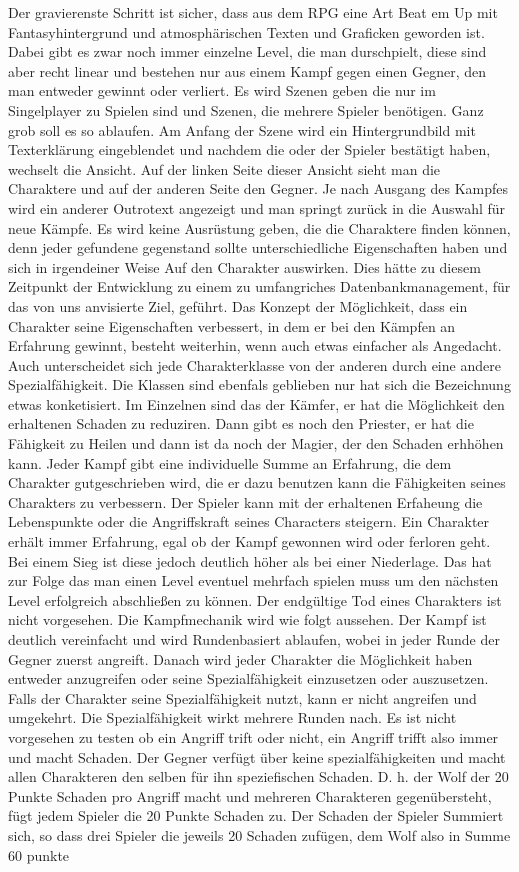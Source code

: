 Der gravierenste Schritt ist sicher, dass aus dem RPG eine Art Beat em Up mit Fantasyhintergrund und atmosphärischen Texten und Graficken geworden ist. Dabei gibt es zwar noch immer einzelne Level, die man durschpielt, diese sind aber recht linear und bestehen nur aus einem Kampf gegen einen Gegner, den man entweder gewinnt oder verliert. Es wird Szenen geben die nur im Singelplayer zu Spielen sind und Szenen, die mehrere Spieler benötigen. Ganz grob soll es so ablaufen. Am Anfang der Szene wird ein Hintergrundbild mit Texterklärung eingeblendet und nachdem die oder der Spieler bestätigt haben, wechselt die Ansicht. Auf der linken Seite dieser Ansicht sieht man die Charaktere und auf der anderen Seite den Gegner. Je nach Ausgang des Kampfes wird ein anderer Outrotext angezeigt und man springt zurück in die Auswahl für neue Kämpfe. Es wird keine Ausrüstung geben, die die Charaktere finden können, denn jeder gefundene gegenstand sollte unterschiedliche Eigenschaften haben und sich in irgendeiner Weise Auf den Charakter auswirken. Dies hätte zu diesem Zeitpunkt der Entwicklung zu einem zu umfangriches Datenbankmanagement, für das von uns anvisierte Ziel, geführt. Das Konzept der Möglichkeit, dass ein Charakter seine Eigenschaften verbessert, in dem er bei den Kämpfen an Erfahrung gewinnt, besteht weiterhin, wenn auch etwas einfacher als Angedacht. Auch unterscheidet sich jede Charakterklasse von der anderen durch eine andere Spezialfähigkeit. Die Klassen sind ebenfals geblieben nur hat sich die Bezeichnung etwas konketisiert. Im Einzelnen sind das der Kämfer, er hat die Möglichkeit den erhaltenen Schaden zu reduziren. Dann gibt es noch den Priester, er hat die Fähigkeit zu Heilen und dann ist da noch der Magier, der den Schaden erhhöhen kann. Jeder Kampf gibt eine individuelle Summe an Erfahrung, die dem Charakter gutgeschrieben wird, die er dazu benutzen kann die Fähigkeiten seines Charakters zu verbessern. Der Spieler kann mit der erhaltenen Erfaheung die Lebenspunkte oder die Angriffskraft seines Characters steigern. Ein Charakter erhält immer Erfahrung, egal ob der Kampf gewonnen wird oder ferloren geht. Bei einem Sieg ist diese jedoch deutlich höher als bei einer Niederlage. Das hat zur Folge das man einen Level eventuel mehrfach spielen muss um den nächsten Level erfolgreich abschließen zu können. Der endgültige Tod eines Charakters ist nicht vorgesehen. Die Kampfmechanik wird wie folgt aussehen. Der Kampf ist deutlich vereinfacht und wird Rundenbasiert ablaufen, wobei in jeder Runde der Gegner zuerst angreift. Danach wird jeder Charakter die Möglichkeit haben entweder anzugreifen oder seine Spezialfähigkeit einzusetzen oder auszusetzen. Falls der Charakter seine Spezialfähigkeit nutzt, kann er nicht angreifen und umgekehrt. Die Spezialfähigkeit wirkt mehrere Runden nach. Es ist nicht vorgesehen zu testen ob ein Angriff trift oder nicht, ein Angriff trifft also immer und macht Schaden. Der Gegner verfügt über keine spezialfähigkeiten und macht allen Charakteren den selben für ihn speziefischen Schaden. D. h. der Wolf der 20 Punkte Schaden pro Angriff macht und mehreren Charakteren gegenübersteht, fügt jedem Spieler die 20 Punkte Schaden zu. Der Schaden der Spieler Summiert sich, so dass drei Spieler die jeweils 20 Schaden zufügen, dem Wolf also in Summe 60 punkte 
